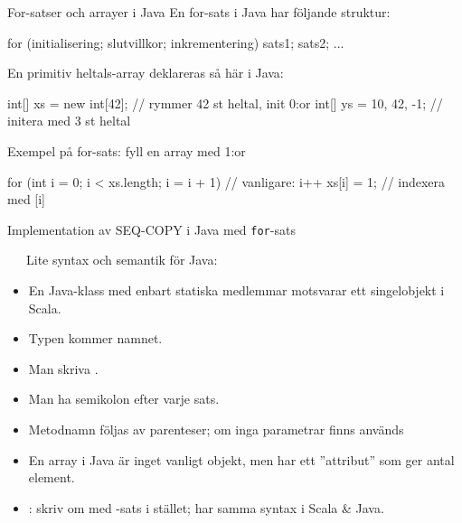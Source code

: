 

\begin{Slide}{For-satser och arrayer i Java}
En for-sats i Java har följande struktur:
\begin{Code}[language=Java, basicstyle=\fontsize{10}{12}\ttfamily\selectfont]
for (initialisering; slutvillkor; inkrementering) {
    sats1;
    sats2;
    ...
}
\end{Code}
En primitiv heltals-array deklareras så här i Java:
\begin{Code}[language=Java, basicstyle=\fontsize{9}{11}\ttfamily\selectfont]
int[] xs = new int[42];  // rymmer 42 st heltal, init 0:or
int[] ys = {10, 42, -1}; // initera med 3 st heltal
\end{Code}
Exempel på for-sats: fyll en array med 1:or
\begin{Code}[language=Java, basicstyle=\fontsize{9}{11}\ttfamily\selectfont]
for (int i = 0; i < xs.length; i = i + 1){ // vanligare: i++
  xs[i] = 1;                             // indexera med [i]
}
\end{Code}

\end{Slide}

\begin{Slide}{Implementation av SEQ-COPY i Java med \texttt{for}-sats}
\begin{minipage}{0.55\textwidth}
\vspace{-0.5em}
\end{minipage}
\begin{minipage}{0.44\textwidth}\SlideFontTiny\vspace{-1.5em}\ifkompendium\small\fi
~~~Lite syntax och semantik för Java:
\begin{itemize}
\item En Java-klass med enbart statiska medlemmar motsvarar ett singelobjekt i Scala.

\item Typen kommer  namnet.

\item Man  skriva .

\item Man  ha semikolon efter varje sats.

\item Metodnamn  följas av parenteser; om inga parametrar finns används \code{()}

\item En array i Java är inget vanligt objekt, men har ett ''attribut''  som ger antal element.

\item {}: skriv om med -sats i stället; har samma syntax i Scala \& Java.

\end{itemize}
\end{minipage}

\end{Slide}
